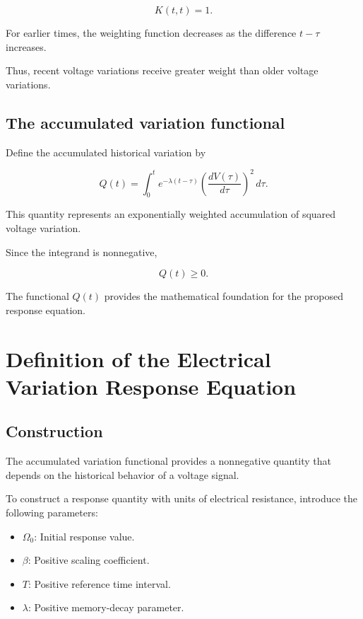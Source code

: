 \documentclass[12pt]{article}
\theoremstyle{definition}
\theoremstyle{remark}
\begin{document}
\[
K(t,t)=1.
\]

For earlier times, the weighting function
decreases as the difference \(t-\tau\) increases.

Thus, recent voltage variations receive greater
weight than older voltage variations.

\subsection{The accumulated variation functional}

Define the accumulated historical variation
by

\begin{equation}
Q(t)=
\int_0^t
e^{-\lambda(t-\tau)}
\left(\frac{dV(\tau)}{d\tau}\right)^2
\,d\tau.
\label{eq:variation-functional}
\end{equation}

This quantity represents an exponentially
weighted accumulation of squared voltage
variation.

Since the integrand is nonnegative,

\[
Q(t)\geq0.
\]

The functional \(Q(t)\) provides the mathematical
foundation for the proposed response equation.

\section{Definition of the Electrical Variation Response Equation}

\subsection{Construction}

The accumulated variation functional provides
a nonnegative quantity that depends on the
historical behavior of a voltage signal.

To construct a response quantity with units
of electrical resistance, introduce the following
parameters:

\begin{itemize}
    \item \(\Omega_0\): Initial response value.
    \item \(\beta\): Positive scaling coefficient.
    \item \(T\): Positive reference time interval.
    \item \(\lambda\): Positive memory-decay parameter.
\end{itemize}
\end{document}
